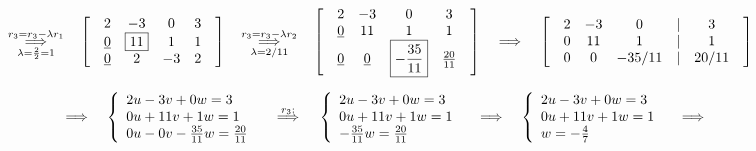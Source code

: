 \documentclass[fleqn]{article}
\begin{document}
\[
\overset{r_3=r_3-\lambda r_1}{\underset{\lambda=\frac{2}{2}=1}{\implies}} \hspace{0.321cm}
\begin{bmatrix}
& 2 & -3 & 0  & 3 & \\
& \underline{ 0 } & \boxed{11} & 1 &  1 & \\
& \underline{0} & 2 & -3 & 2 &
\end{bmatrix}
\hspace{0.321cm} \overset{r_3=r_3-\lambda r_2}{\underset{\lambda=2/11}{\implies}} \hspace{0.321cm}
\begin{bmatrix}
& 2 & -3 & 0  & 3 & \\
& \underline{ 0 } & 11 & 1 &  1 & \\
& \underline{0} & \underline{0} & \boxed{-\frac{35}{11}} & \frac{20}{11} &
\end{bmatrix}
\hspace{0.321cm} {\implies} \hspace{0.321cm}
\begin{bmatrix}
& 2 & -3 & 0 & | & 3 & \\
& 0 & 11 & 1 & | & 1 & \\
& 0 & 0 & {-35/11} & | & 20/11 &
\end{bmatrix}
\hspace{0.234cm}
\]

\[
\hspace{0.321cm} {\implies} \hspace{0.321cm}
\left\{
\begin{array}{l}
2u - 3v + 0w = 3 \\
0u + 11v + 1w = 1 \\
0u - 0v - \frac{35}{11}w = \frac{20}{11}
\end{array}
\right.
\hspace{0.321cm} \overset{r_3:}{\implies} \hspace{0.321cm}
\left\{
\begin{array}{l}
2u - 3v + 0w = 3 \\
0u + 11v + 1w = 1 \\
- \frac{35}{11}w = \frac{20}{11}
\end{array}
\right.
\hspace{0.321cm} {\implies} \hspace{0.321cm}
\left\{
\begin{array}{l}
2u - 3v + 0w = 3 \\
0u + 11v + 1w = 1 \\
w = -\frac{4}{7}
\end{array}
\right.
\hspace{0.321cm} {\implies} \hspace{0.321cm}
\]
\end{document}
